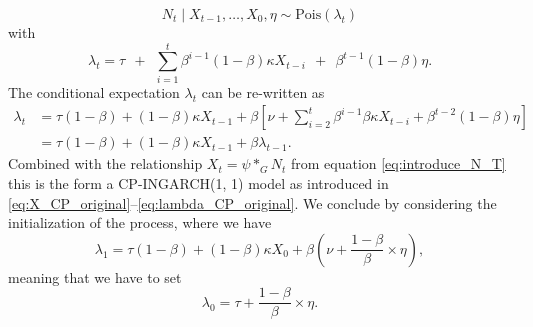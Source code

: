 \documentclass[review]{elsarticle}
\begin{document}
$$
N_t \mid X_{t - 1}, \dots, X_0, \eta \sim \text{Pois}(\lambda_t)
$$
with
$$
\lambda_t = \tau \ \ + \ \ \sum_{i = 1}^t \beta^{i - 1}(1 - \beta)\kappa X_{t - i} \ \ + \ \ \beta^{t - 1}(1 - \beta)\eta.
$$
The conditional expectation $\lambda_t$ can be re-written as
\begin{align*}
\lambda_t & = \tau(1 - \beta) + (1 - \beta)\kappa X_{t - 1} + \beta \left[\nu +   \sum_{i = 2}^t \beta^{i - 1}\beta\kappa X_{t - i}  + \beta^{t - 2}(1 - \beta)\eta\right]\\
& = \tau(1 - \beta) + (1 - \beta)\kappa X_{t - 1} + \beta \lambda_{t - 1}.
\end{align*}
Combined with the relationship $X_t = \psi *_G N_t$ from equation \eqref{eq:introduce_N_T} this is the form a CP-INGARCH(1, 1) model as introduced in \eqref{eq:X_CP_original}--\eqref{eq:lambda_CP_original}. We conclude by considering the initialization of the process, where we have
$$
\lambda_1 = \tau(1 - \beta) + (1 - \beta)\kappa X_0 + \beta\left(\nu + \frac{1 - \beta}{\beta} \times \eta \right),
$$
meaning that we have to set
$$
\lambda_0 = \tau + \frac{1 - \beta}{\beta} \times \eta.
$$

%
%
%


\end{document}
